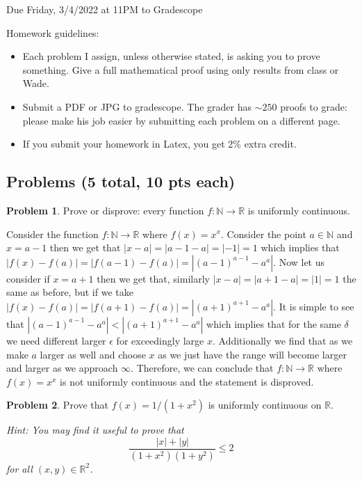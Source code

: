 \documentclass[11pt]{article}
\theoremstyle{definition}
\newtheorem{problem}{Problem}
\newcommand{\N}{\mathbb{N}}
\newcommand{\R}{\mathbb{R}}
\begin{document}
  \hfill Due Friday, 3/4/2022 at 11PM to Gradescope

\bigskip

\noindent Homework guidelines: 
\begin{itemize}
\item Each problem I assign, unless otherwise stated, is asking you to prove something. Give a full mathematical proof using only results from class or Wade.
\item Submit a PDF or JPG to gradescope. The grader has $\sim 250$ proofs to grade:  please make his job easier by submitting each problem on a different page. 
\item If you submit your homework in Latex, you get 2\% extra credit. 
\end{itemize}

\subsection*{Problems (5 total, 10 pts each)}

\begin{problem}
Prove or disprove: every function $f : \N \to \R$ is uniformly continuous. 
\end{problem}

Consider the function $f : \N \rightarrow \R$ where $f(x) = x^x$. Consider the point $a\in \N$ and $x=a-1$ then we get that $|x-a| = |a-1-a| = |-1|=1$ which implies that $|f(x)-f(a)|=|f(a-1)-f(a)| =|(a-1)^{a-1}-a^a|$. Now let us consider if $x=a+1$ then we get that, similarly $|x-a|=|a+1-a|=|1|=1$ the same as before, but if we take $|f(x)-f(a)|=|f(a+1)-f(a)|=|(a+1)^{a+1}-a^a|$. It is simple to see that $|(a-1)^{a-1}-a^a| <|(a+1)^{a+1}-a^a|$ which implies that for the same $\delta$ we need different larger $\epsilon$ for exceedingly large $x$. Additionally we find that as we make $a$ larger as well and choose $x$ as we just have the range will become larger and larger as we approach $\infty$. Therefore, we can conclude that $f: \N\rightarrow\R$ where $f(x)=x^x$ is not uniformly continuous and the statement is disproved.

\pagebreak
\begin{problem}
Prove that $f(x) = 1 / (1 + x^2)$ is uniformly continuous on $\R$. 

{\it Hint: You may find it useful to prove that 
\[
\frac{| x| + |y|}{(1 + x^2) ( 1 + y^2)} \leq 2
\]
for all $(x,y) \in \R^2$. 
}
\end{problem}
\end{document}
